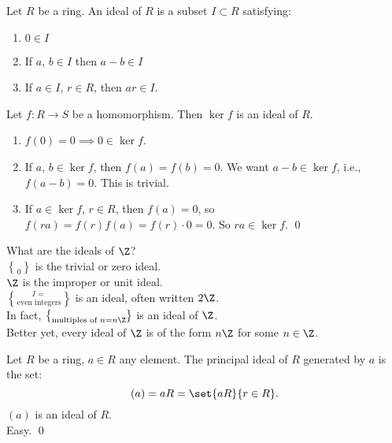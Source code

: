  Let $R$ be a ring.  An ideal of $R$ is a subset $I\subset R$ satisfying:
\begin{enumerate}[label=(\arabic*)]
\item $0\in I$
\item If $a$, $b\in I$ then $a-b\in I$
\item If $a\in I$, $r\in R$, then $ar\in I$.
\end{enumerate}
\thm Let $f\colon R\to S$ be a homomorphism.  Then $\ker f$ is an ideal of $R$. \\
\pf \begin{enumerate}[label=(\arabic*)]
\item $f(0)=0\implies0\in\ker f$.
\item If $a$, $b\in\ker f$, then $f(a)=f(b)=0$.  We want $a-b\in\ker f$, i.e., $f(a-b)=0$.  This is trivial.
\item If $a\in\ker f$, $r\in R$, then $f(a)=0$, so $f(ra)=f(r)f(a)=f(r)\cdot0=0$.  So $ra\in\ker f$. \qed
\end{enumerate}
\eg What are the ideals of $\Z$? \\
$\brace0$ is the trivial or zero ideal. \\
$\Z$ is the improper or unit ideal. \\
$I=\brace{\text{even integers}}$ is an ideal, often written $2\Z$. \\
In fact, $\brace{\text{multiples of $n$}}=n\Z$ is an ideal of $\Z$. \\
Better yet, every ideal of $\Z$ is of the form $n\Z$ for some $n\in\Z$.

 Let $R$ be a ring, $a\in R$ any element.  The principal ideal of $R$ generated by $a$ is the set:
\[ (a) = aR = \set{aR}{r\in R} . \]
\thm $(a)$ is an ideal of $R$. \\
\pf Easy. \qed
